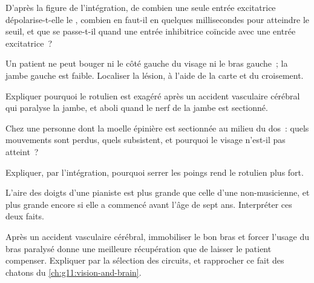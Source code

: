 \begin{exercise}[$\star\star$]\label{exo:g12:brain-and-movement:6}
D'après la figure de l'intégration, de combien une seule entrée
excitatrice dépolarise-t-elle le , combien en faut-il en
quelques millisecondes pour atteindre le seuil, et que se passe-t-il
quand une entrée inhibitrice coïncide avec une entrée excitatrice~?
\end{exercise}

\begin{exercise}[$\star\star$]\label{exo:g12:brain-and-movement:7}
Un patient ne peut bouger ni le côté gauche du visage ni le bras
gauche~; la jambe gauche est faible. Localiser la lésion, à l'aide de
la carte et du croisement.
\end{exercise}

\begin{exercise}[$\star\star$]\label{exo:g12:brain-and-movement:8}
Expliquer pourquoi le  rotulien est exagéré après un accident
vasculaire cérébral qui paralyse la jambe, et aboli quand le nerf de
la jambe est sectionné.
\end{exercise}

\begin{exercise}[$\star\star$]\label{exo:g12:brain-and-movement:9}
Chez une personne dont la moelle épinière est sectionnée au milieu du
dos~: quels mouvements sont perdus, quels  subsistent, et
pourquoi le visage n'est-il pas atteint~?
\end{exercise}

\begin{exercise}[$\star\star$]\label{exo:g12:brain-and-movement:10}
Expliquer, par l'intégration, pourquoi serrer les poings rend le
 rotulien plus fort.
\end{exercise}

\begin{exercise}[$\star\star$]\label{exo:g12:brain-and-movement:11}
L'aire des doigts d'une pianiste est plus grande que celle d'une
non-musicienne, et plus grande encore si elle a commencé avant l'âge
de sept ans. Interpréter ces deux faits.
\end{exercise}

\begin{exercise}[$\star\star\star$]\label{exo:g12:brain-and-movement:12}
Après un accident vasculaire cérébral, immobiliser le bon bras et
forcer l'usage du bras paralysé donne une meilleure récupération que
de laisser le patient compenser. Expliquer par la sélection des
circuits, et rapprocher ce fait des chatons du
\cref{ch:g11:vision-and-brain}.
\end{exercise}

